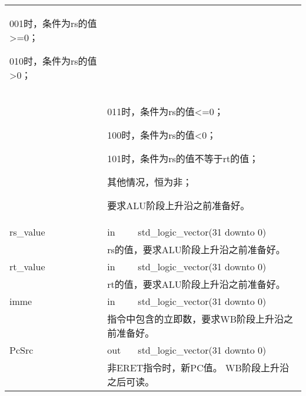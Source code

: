 \begin{tabularx}{\textwidth}{lll}
{                    001时，条件为rs的值>=0；

                    010时，条件为rs的值>0；
            } \\
            &
            \multicolumn{2}{X}{
                    011时，条件为rs的值<=0；

                    100时，条件为rs的值<0；

                    101时，条件为rs的值不等于rt的值；

                    其他情况，恒为非；

                要求ALU阶段上升沿之前准备好。
            } \\
            \midrule
            rs\_value       & in    & std\_logic\_vector(31 downto 0) \\
            \cmidrule(l){2-3}
            &
            \multicolumn{2}{X}{
                rs的值，要求ALU阶段上升沿之前准备好。
            } \\
            \midrule
            rt\_value       & in    & std\_logic\_vector(31 downto 0) \\
            \cmidrule(l){2-3}
            &
            \multicolumn{2}{X}{
                rt的值，要求ALU阶段上升沿之前准备好。
            } \\
            \midrule
            imme            & in    & std\_logic\_vector(31 downto 0) \\
            \cmidrule(l){2-3}
            &
            \multicolumn{2}{X}{
                指令中包含的立即数，要求WB阶段上升沿之前准备好。
            } \\
            \midrule
            PcSrc            & out   & std\_logic\_vector(31 downto 0) \\
            \cmidrule(l){2-3}
            &
            \multicolumn{2}{X}{
                非ERET指令时，新PC值。                                                       
                WB阶段上升沿之后可读。
            } \\
                

            \bottomrule
        \end{tabularx}

